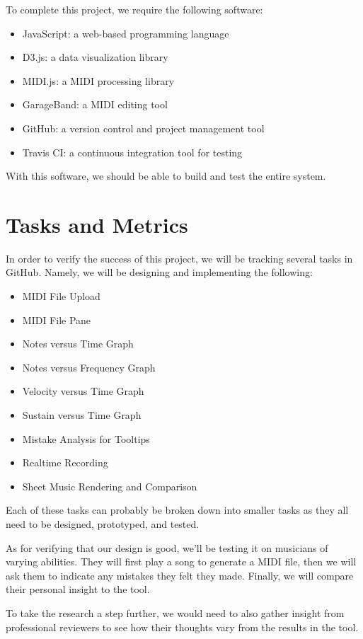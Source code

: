 \documentclass[journal]{vgtc}                %
\begin{document}
To complete this project, we require the following software:

\begin{itemize}
\item JavaScript: a web-based programming language
\item D3.js: a data visualization library
\item MIDI.js: a MIDI processing library
\item GarageBand: a MIDI editing tool
\item GitHub: a version control and project management tool
\item Travis CI: a continuous integration tool for testing
\end{itemize}

With this software, we should be able to build and test the entire system.

\section{Tasks and Metrics}

In order to verify the success of this project, we will be tracking several
tasks in GitHub. Namely, we will be designing and implementing the following:

\begin{itemize}
\item MIDI File Upload
\item MIDI File Pane
\item Notes versus Time Graph
\item Notes versus Frequency Graph
\item Velocity versus Time Graph
\item Sustain versus Time Graph
\item Mistake Analysis for Tooltips
\item Realtime Recording
\item Sheet Music Rendering and Comparison
\end{itemize}

Each of these tasks can probably be broken down into smaller tasks as they all
need to be designed, prototyped, and tested.

As for verifying that our design is good, we'll be testing it on musicians
of varying abilities. They will first play a song to generate a MIDI file,
then we will ask them to indicate any mistakes they felt they made. Finally,
we will compare their personal insight to the tool.

To take the research a step further, we would need to also gather insight from
professional reviewers to see how their thoughts vary from the results in the
tool.
\end{document}
